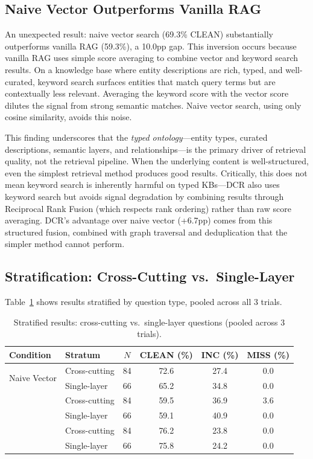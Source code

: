 \documentclass[11pt,a4paper]{article}
\begin{document}
\subsection{Naive Vector Outperforms Vanilla RAG}

An unexpected result: naive vector search (69.3\% CLEAN) substantially outperforms vanilla RAG (59.3\%), a 10.0pp gap. This inversion occurs because vanilla RAG uses simple score averaging to combine vector and keyword search results. On a knowledge base where entity descriptions are rich, typed, and well-curated, keyword search surfaces entities that match query terms but are contextually less relevant. Averaging the keyword score with the vector score dilutes the signal from strong semantic matches. Naive vector search, using only cosine similarity, avoids this noise.

This finding underscores that the \emph{typed ontology}---entity types, curated descriptions, semantic layers, and relationships---is the primary driver of retrieval quality, not the retrieval pipeline. When the underlying content is well-structured, even the simplest retrieval method produces good results. Critically, this does not mean keyword search is inherently harmful on typed KBs---DCR also uses keyword search but avoids signal degradation by combining results through Reciprocal Rank Fusion (which respects rank ordering) rather than raw score averaging. DCR's advantage over naive vector (+6.7pp) comes from this structured fusion, combined with graph traversal and deduplication that the simpler method cannot perform.

\subsection{Stratification: Cross-Cutting vs.\ Single-Layer}

Table~\ref{tab:stratified} shows results stratified by question type, pooled across all 3 trials.

\begin{table}[t]
\centering
\caption{Stratified results: cross-cutting vs.\ single-layer questions (pooled across 3 trials).}
\label{tab:stratified}
\begin{tabular}{@{}llcccc@{}}
\toprule
Condition & Stratum & $N$ & CLEAN (\%) & INC (\%) & MISS (\%) \\
\midrule
\multirow{2}{*}{Naive Vector} & Cross-cutting & 84 & 72.6 & 27.4 & 0.0 \\
& Single-layer & 66 & 65.2 & 34.8 & 0.0 \\
\addlinespace
\multirow{2}{*}{Vanilla RAG} & Cross-cutting & 84 & 59.5 & 36.9 & 3.6 \\
& Single-layer & 66 & 59.1 & 40.9 & 0.0 \\
\addlinespace
\multirow{2}{*}{DCR} & Cross-cutting & 84 & 76.2 & 23.8 & 0.0 \\
& Single-layer & 66 & 75.8 & 24.2 & 0.0 \\
\bottomrule
\end{tabular}
\end{table}
\end{document}
